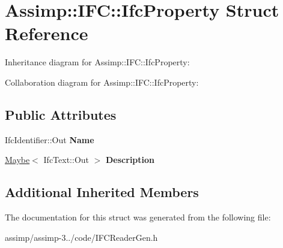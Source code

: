 \hypertarget{struct_assimp_1_1_i_f_c_1_1_ifc_property}{\section{Assimp\+:\+:I\+F\+C\+:\+:Ifc\+Property Struct Reference}
\label{struct_assimp_1_1_i_f_c_1_1_ifc_property}
}


Inheritance diagram for Assimp\+:\+:I\+F\+C\+:\+:Ifc\+Property\+:


Collaboration diagram for Assimp\+:\+:I\+F\+C\+:\+:Ifc\+Property\+:
\subsection*{Public Attributes}
\begin{DoxyCompactItemize}
\item 
\hypertarget{struct_assimp_1_1_i_f_c_1_1_ifc_property_abe01ea9bc1d6134b403ed35c35f3665f}{Ifc\+Identifier\+::\+Out {\bfseries Name}}\label{struct_assimp_1_1_i_f_c_1_1_ifc_property_abe01ea9bc1d6134b403ed35c35f3665f}

\item 
\hypertarget{struct_assimp_1_1_i_f_c_1_1_ifc_property_a2bb230b7233e1f46f3122fca2c039806}{\hyperlink{struct_assimp_1_1_s_t_e_p_1_1_maybe}{Maybe}$<$ Ifc\+Text\+::\+Out $>$ {\bfseries Description}}\label{struct_assimp_1_1_i_f_c_1_1_ifc_property_a2bb230b7233e1f46f3122fca2c039806}

\end{DoxyCompactItemize}
\subsection*{Additional Inherited Members}


The documentation for this struct was generated from the following file\+:\begin{DoxyCompactItemize}
\item 
assimp/assimp-\/3../code/I\+F\+C\+Reader\+Gen.\+h\end{DoxyCompactItemize}

